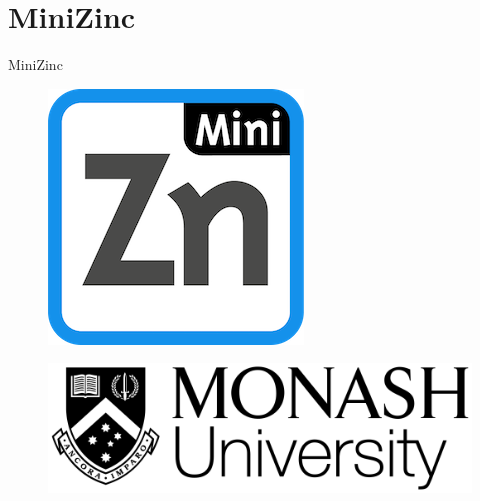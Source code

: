 \documentclass[mathserif,table]{gkibeamer-aaai}
\begin{document}
\section{MiniZinc}

\begin{frame}{MiniZinc}
	\begin{figure}[ht]
		\includegraphics[scale=0.2]{./figures/minizinc_logo.png}
	\end{figure}
	\begin{figure}[ht]
		\includegraphics[scale=0.1]{./figures/monash_logo.png}
	\end{figure}
\end{frame}
\end{document}
